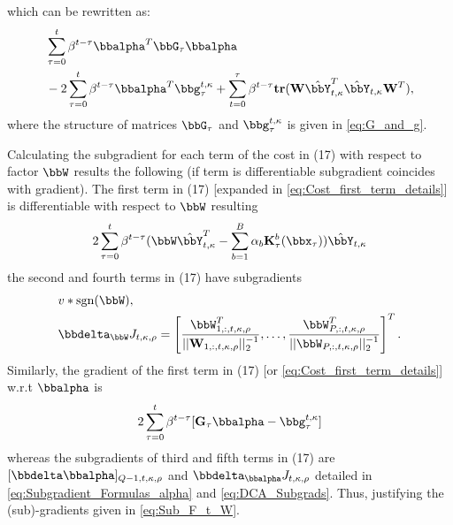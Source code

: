 \documentclass[10pt,final]{IEEEtran}
\begin{document}
which can be rewritten as:
\begin{align}\label{eq:Cost_first_term_details_b}
&\sum_{\tau=0}^{t}\beta^{t-\tau}{\bbalpha}^T\bbG_{\tau}{\bbalpha}\nonumber\\
&-2\sum_{\tau=0}^{t}\beta^{t-\tau}{\bbalpha}^T\bbg_{\tau}^{t,\kappa}+\sum_{t=0}^{\tau}\beta^{t-\tau}\mathbf{tr}(\mathbf{W}\hat{\bbY}_{t,\kappa}^T\hat{\bbY}_{t,\kappa}\mathbf{W}^T),
\end{align}
where the structure of matrices $\bbG_{\tau}$ and $\bbg_{\tau}^{t,\kappa}$ is given in \eqref{eq:G_and_g}.

Calculating the subgradient  for each term of the cost in  (17) with respect to factor $\bbW$ results the following (if term is differentiable subgradient coincides with gradient). The first term in (17) [expanded in \eqref{eq:Cost_first_term_details}] is differentiable with respect to $\bbW$ resulting
\begin{align}\label{eq:First_term}
2\sum_{\tau=0}^{t}\beta^{t-\tau}(\bbW\hat{\bbY}_{t,\kappa}^T-\sum_{b=1}^{B}\alpha_{b}\mathbf{K}_{\tau}^b(\bbx_{\tau}))\hat{\bbY}_{t,\kappa}
\end{align}
the second and fourth terms in (17) have subgradients
\begin{align}\label{eq:Sec_term}
& v*\textrm{sgn}({\bbW}),\\
& \bbdelta_{\bbW} J_{t,\kappa,\rho}=
\left[\frac{\bbW_{1,:,t,\kappa,\rho}^T}{||\mathbf{W}_{1,:,t,\kappa,\rho}||_2^{-1}},\ldots,
\frac{\bbW_{P,:,t,\kappa,\rho}^T}{||{\bbW}_{P,:,t,\kappa,\rho}||_2^{-1}}
\right]^T.
\end{align}
Similarly, the gradient of the first term in (17) [or \eqref{eq:Cost_first_term_details}] w.r.t $\bbalpha$ is 
\begin{equation}
 2\sum_{\tau=0}^{t}\beta^{t-\tau}[\mathbf{G}_{\tau}\bbalpha-\bbg_{\tau}^{t,\kappa}]
\end{equation}
whereas the subgradients of third and fifth terms in (17) are 
$[\bbdelta\bbalpha]_{Q-1,t,\kappa,\rho}$ and $\bbdelta_{\bbalpha} J_{t,\kappa,\rho}$ detailed in \eqref{eq:Subgradient_Formulas_alpha} and \eqref{eq:DCA_Subgrads}.
Thus, justifying the (sub)-gradients given in \eqref{eq:Sub_F_t_W}.
\end{document}
